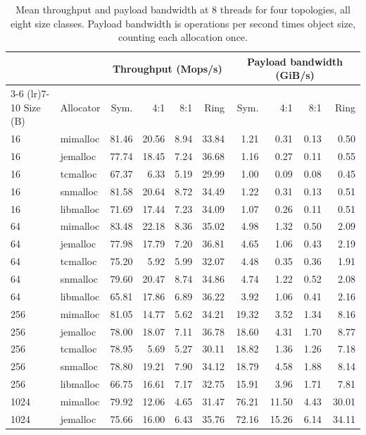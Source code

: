 \begin{table}[!htbp]
\centering
\scriptsize
\setlength{\tabcolsep}{3pt}
\caption{Mean throughput and payload bandwidth at 8 threads for four topologies, all eight size classes. Payload bandwidth is operations per second times object size, counting each allocation once.}
\label{tab:throughput-bandwidth}
\begin{tabular}{llrrrrrrrr}
\toprule
& & \multicolumn{4}{c}{Throughput (Mops/s)} & \multicolumn{4}{c}{Payload bandwidth (GiB/s)}\\
\cmidrule(lr){3-6} \cmidrule(lr){7-10}
Size (B) & Allocator & Sym. & 4:1 & 8:1 & Ring & Sym. & 4:1 & 8:1 & Ring\\
\midrule
16 & mimalloc & 81.46 & 20.56 & 8.94 & 33.84 & 1.21 & 0.31 & 0.13 & 0.50 \\
16 & jemalloc & 77.74 & 18.45 & 7.24 & 36.68 & 1.16 & 0.27 & 0.11 & 0.55 \\
16 & tcmalloc & 67.37 & 6.33 & 5.19 & 29.99 & 1.00 & 0.09 & 0.08 & 0.45 \\
16 & snmalloc & 81.58 & 20.64 & 8.72 & 34.49 & 1.22 & 0.31 & 0.13 & 0.51 \\
16 & libmalloc & 71.69 & 17.44 & 7.23 & 34.09 & 1.07 & 0.26 & 0.11 & 0.51 \\
64 & mimalloc & 83.48 & 22.18 & 8.36 & 35.02 & 4.98 & 1.32 & 0.50 & 2.09 \\
64 & jemalloc & 77.98 & 17.79 & 7.20 & 36.81 & 4.65 & 1.06 & 0.43 & 2.19 \\
64 & tcmalloc & 75.20 & 5.92 & 5.99 & 32.07 & 4.48 & 0.35 & 0.36 & 1.91 \\
64 & snmalloc & 79.60 & 20.47 & 8.74 & 34.86 & 4.74 & 1.22 & 0.52 & 2.08 \\
64 & libmalloc & 65.81 & 17.86 & 6.89 & 36.22 & 3.92 & 1.06 & 0.41 & 2.16 \\
256 & mimalloc & 81.05 & 14.77 & 5.62 & 34.21 & 19.32 & 3.52 & 1.34 & 8.16 \\
256 & jemalloc & 78.00 & 18.07 & 7.11 & 36.78 & 18.60 & 4.31 & 1.70 & 8.77 \\
256 & tcmalloc & 78.95 & 5.69 & 5.27 & 30.11 & 18.82 & 1.36 & 1.26 & 7.18 \\
256 & snmalloc & 78.80 & 19.21 & 7.90 & 34.12 & 18.79 & 4.58 & 1.88 & 8.14 \\
256 & libmalloc & 66.75 & 16.61 & 7.17 & 32.75 & 15.91 & 3.96 & 1.71 & 7.81 \\
1024 & mimalloc & 79.92 & 12.06 & 4.65 & 31.47 & 76.21 & 11.50 & 4.43 & 30.01 \\
1024 & jemalloc & 75.66 & 16.00 & 6.43 & 35.76 & 72.16 & 15.26 & 6.14 & 34.11 \\

\end{tabular}
\end{table}
